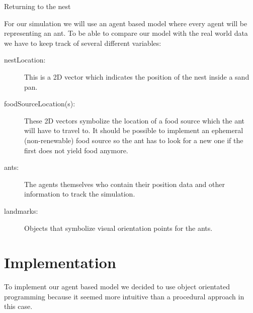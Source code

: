 \documentclass[11pt]{article}
\begin{document}
\begin{algorithm}[H]

\caption{Returning to the nest}
\end{algorithm}







\newpage

For our simulation we will use an agent based model where every agent will be representing an ant. To be able to compare our model with the real world data we have to keep track of several different variables:
\begin{description}
\item[nestLocation:] This is a 2D vector which indicates the position of the nest inside a sand pan.
\item[foodSourceLocation(s): ]These 2D vectors symbolize the location of a food source which the ant will have to travel to. It should be possible to implement an ephemeral (non-renewable) food source so the ant has to look for a new one if the first does not yield food anymore.
\item [ants: ]The agents themselves who contain their position data and other information to track the simulation.
\item[landmarks:]Objects that symbolize visual orientation points for the ants.
\end{description}












\section{Implementation}
To implement our agent based model we decided to use object orientated programming because it
seemed more intuitive than a procedural approach in this case.
\end{document}
